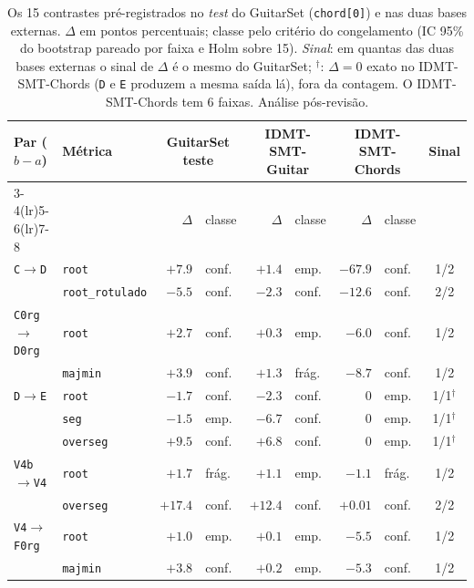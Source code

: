 \begin{table}[t]
  \centering
  \caption{Os 15 contrastes pré-registrados no \emph{test} do GuitarSet (\texttt{chord[0]}) e nas duas bases externas. $\Delta$ em pontos percentuais; classe pelo critério do congelamento (IC 95\% do bootstrap pareado por faixa e Holm sobre 15). \emph{Sinal}: em quantas das duas bases externas o sinal de $\Delta$ é o mesmo do GuitarSet; $^\dagger$: $\Delta = 0$ exato no IDMT-SMT-Chords (\texttt{D} e \texttt{E} produzem a mesma saída lá), fora da contagem. O IDMT-SMT-Chords tem 6 faixas. Análise pós-revisão.}
  \label{tab:transferencia}
  \footnotesize
  \begin{tabular}{llrlrlrlc}
    \toprule
    Par ($b-a$) & Métrica & \multicolumn{2}{c}{GuitarSet teste} & \multicolumn{2}{c}{IDMT-SMT-Guitar} & \multicolumn{2}{c}{IDMT-SMT-Chords} & Sinal \\
    \cmidrule(lr){3-4}\cmidrule(lr){5-6}\cmidrule(lr){7-8}
     & & $\Delta$ & classe & $\Delta$ & classe & $\Delta$ & classe & \\
    \midrule
    \texttt{C}$\to$\texttt{D} & \texttt{root} & $+7.9$ & conf. & $+1.4$ & emp. & $-67.9$ & conf. & 1/2 \\
     & \texttt{root\_rotulado} & $-5.5$ & conf. & $-2.3$ & conf. & $-12.6$ & conf. & 2/2 \\
    \addlinespace
    \texttt{C0rg}$\to$\texttt{D0rg} & \texttt{root} & $+2.7$ & conf. & $+0.3$ & emp. & $-6.0$ & conf. & 1/2 \\
     & \texttt{majmin} & $+3.9$ & conf. & $+1.3$ & frág. & $-8.7$ & conf. & 1/2 \\
    \addlinespace
    \texttt{D}$\to$\texttt{E} & \texttt{root} & $-1.7$ & conf. & $-2.3$ & conf. & $0$ & emp. & 1/1$^\dagger$ \\
     & \texttt{seg} & $-1.5$ & emp. & $-6.7$ & conf. & $0$ & emp. & 1/1$^\dagger$ \\
     & \texttt{overseg} & $+9.5$ & conf. & $+6.8$ & conf. & $0$ & emp. & 1/1$^\dagger$ \\
    \addlinespace
    \texttt{V4b}$\to$\texttt{V4} & \texttt{root} & $+1.7$ & frág. & $+1.1$ & emp. & $-1.1$ & frág. & 1/2 \\
     & \texttt{overseg} & $+17.4$ & conf. & $+12.4$ & conf. & $+0.01$ & conf. & 2/2 \\
    \addlinespace
    \texttt{V4}$\to$\texttt{F0rg} & \texttt{root} & $+1.0$ & emp. & $+0.1$ & emp. & $-5.5$ & conf. & 1/2 \\
     & \texttt{majmin} & $+3.8$ & conf. & $+0.2$ & emp. & $-5.3$ & conf. & 1/2 \\

\end{tabular}
\end{table}
